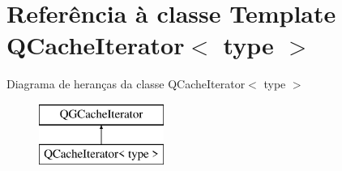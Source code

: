 \hypertarget{class_q_cache_iterator}{\section{Referência à classe Template Q\-Cache\-Iterator$<$ type $>$}
\label{class_q_cache_iterator}
}
Diagrama de heranças da classe Q\-Cache\-Iterator$<$ type $>$\begin{figure}[H]
\begin{center}
\leavevmode
\includegraphics[height=2.000000cm]{class_q_cache_iterator}
\end{center}
\end{figure}
